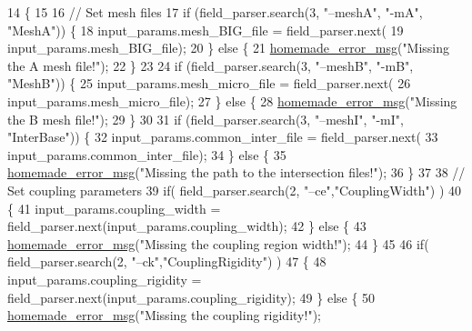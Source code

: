 \begin{DoxyCode}
14                                                                \{
15 
16     \textcolor{comment}{// Set mesh files}
17     \textcolor{keywordflow}{if} (field\_parser.search(3, \textcolor{stringliteral}{"--meshA"}, \textcolor{stringliteral}{"-mA"}, \textcolor{stringliteral}{"MeshA"})) \{
18         input\_params.mesh\_BIG\_file = field\_parser.next(
19                 input\_params.mesh\_BIG\_file);
20     \} \textcolor{keywordflow}{else} \{
21         \hyperlink{common__header_8h_a05d65d26b911668ac90085745dca71f6}{homemade\_error\_msg}(\textcolor{stringliteral}{"Missing the A mesh file!"});
22     \}
23 
24     \textcolor{keywordflow}{if} (field\_parser.search(3, \textcolor{stringliteral}{"--meshB"}, \textcolor{stringliteral}{"-mB"}, \textcolor{stringliteral}{"MeshB"})) \{
25         input\_params.mesh\_micro\_file = field\_parser.next(
26                 input\_params.mesh\_micro\_file);
27     \} \textcolor{keywordflow}{else} \{
28         \hyperlink{common__header_8h_a05d65d26b911668ac90085745dca71f6}{homemade\_error\_msg}(\textcolor{stringliteral}{"Missing the B mesh file!"});
29     \}
30 
31     \textcolor{keywordflow}{if} (field\_parser.search(3, \textcolor{stringliteral}{"--meshI"}, \textcolor{stringliteral}{"-mI"}, \textcolor{stringliteral}{"InterBase"})) \{
32         input\_params.common\_inter\_file = field\_parser.next(
33                 input\_params.common\_inter\_file);
34     \} \textcolor{keywordflow}{else} \{
35         \hyperlink{common__header_8h_a05d65d26b911668ac90085745dca71f6}{homemade\_error\_msg}(\textcolor{stringliteral}{"Missing the path to the intersection files!"});
36     \}
37 
38     \textcolor{comment}{// Set coupling parameters}
39     \textcolor{keywordflow}{if}( field\_parser.search(2, \textcolor{stringliteral}{"--ce"},\textcolor{stringliteral}{"CouplingWidth"}) )
40     \{
41         input\_params.coupling\_width = field\_parser.next(input\_params.coupling\_width);
42     \} \textcolor{keywordflow}{else} \{
43         \hyperlink{common__header_8h_a05d65d26b911668ac90085745dca71f6}{homemade\_error\_msg}(\textcolor{stringliteral}{"Missing the coupling region width!"});
44     \}
45 
46     \textcolor{keywordflow}{if}( field\_parser.search(2, \textcolor{stringliteral}{"--ck"},\textcolor{stringliteral}{"CouplingRigidity"}) )
47     \{
48         input\_params.coupling\_rigidity = field\_parser.next(input\_params.coupling\_rigidity);
49     \} \textcolor{keywordflow}{else} \{
50         \hyperlink{common__header_8h_a05d65d26b911668ac90085745dca71f6}{homemade\_error\_msg}(\textcolor{stringliteral}{"Missing the coupling rigidity!"});

\end{DoxyCode}
